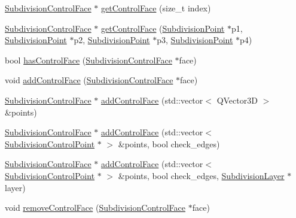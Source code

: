 \begin{DoxyCompactItemize}
\item 
\hyperlink{classShipCAD_1_1SubdivisionControlFace}{Subdivision\-Control\-Face} $\ast$ \hyperlink{classShipCAD_1_1SubdivisionSurface_a392f052a12118427919b910e99663d92}{get\-Control\-Face} (size\-\_\-t index)
\item 
\hyperlink{classShipCAD_1_1SubdivisionControlFace}{Subdivision\-Control\-Face} $\ast$ \hyperlink{classShipCAD_1_1SubdivisionSurface_a536574cc453e4790a769a3e7d47b7ff1}{get\-Control\-Face} (\hyperlink{classShipCAD_1_1SubdivisionPoint}{Subdivision\-Point} $\ast$p1, \hyperlink{classShipCAD_1_1SubdivisionPoint}{Subdivision\-Point} $\ast$p2, \hyperlink{classShipCAD_1_1SubdivisionPoint}{Subdivision\-Point} $\ast$p3, \hyperlink{classShipCAD_1_1SubdivisionPoint}{Subdivision\-Point} $\ast$p4)
\item 
bool \hyperlink{classShipCAD_1_1SubdivisionSurface_ad6e00013faf6c373bfc1421adb941ba4}{has\-Control\-Face} (\hyperlink{classShipCAD_1_1SubdivisionControlFace}{Subdivision\-Control\-Face} $\ast$face)
\item 
void \hyperlink{classShipCAD_1_1SubdivisionSurface_abbbb7422a86771451034d2fb7a76bb26}{add\-Control\-Face} (\hyperlink{classShipCAD_1_1SubdivisionControlFace}{Subdivision\-Control\-Face} $\ast$face)
\item 
\hyperlink{classShipCAD_1_1SubdivisionControlFace}{Subdivision\-Control\-Face} $\ast$ \hyperlink{classShipCAD_1_1SubdivisionSurface_a7c83a514f43b868b5fa286f3bc05a41e}{add\-Control\-Face} (std\-::vector$<$ Q\-Vector3\-D $>$ \&points)
\item 
\hyperlink{classShipCAD_1_1SubdivisionControlFace}{Subdivision\-Control\-Face} $\ast$ \hyperlink{classShipCAD_1_1SubdivisionSurface_a957b534788873921249cd1cc058b9d7e}{add\-Control\-Face} (std\-::vector$<$ \hyperlink{classShipCAD_1_1SubdivisionControlPoint}{Subdivision\-Control\-Point} $\ast$ $>$ \&points, bool check\-\_\-edges)
\item 
\hyperlink{classShipCAD_1_1SubdivisionControlFace}{Subdivision\-Control\-Face} $\ast$ \hyperlink{classShipCAD_1_1SubdivisionSurface_a07d8ca69ed3d45f6e54407fcca8264b2}{add\-Control\-Face} (std\-::vector$<$ \hyperlink{classShipCAD_1_1SubdivisionControlPoint}{Subdivision\-Control\-Point} $\ast$ $>$ \&points, bool check\-\_\-edges, \hyperlink{classShipCAD_1_1SubdivisionLayer}{Subdivision\-Layer} $\ast$layer)
\item 
void \hyperlink{classShipCAD_1_1SubdivisionSurface_a9cce3014753c0b74517b1747a80f6c2c}{remove\-Control\-Face} (\hyperlink{classShipCAD_1_1SubdivisionControlFace}{Subdivision\-Control\-Face} $\ast$face)

\end{DoxyCompactItemize}
